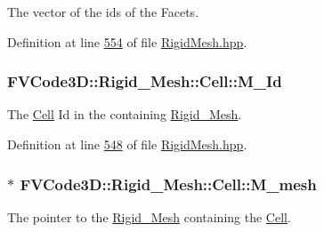 The vector of the ids of the Facets. 



Definition at line \hyperlink{RigidMesh_8hpp_source_l00554}{554} of file \hyperlink{RigidMesh_8hpp_source}{Rigid\+Mesh.\+hpp}.

\subsubsection[{\texorpdfstring{M\+\_\+\+Id}{M_Id}}]{ F\+V\+Code3\+D\+::\+Rigid\+\_\+\+Mesh\+::\+Cell\+::\+M\+\_\+\+Id\hspace{0.3cm}{\ttfamily [protected]}}\hypertarget{classFVCode3D_1_1Rigid__Mesh_1_1Cell_a69cd2ee5b40a1ccc5cb62c529c7abfb2}{}\label{classFVCode3D_1_1Rigid__Mesh_1_1Cell_a69cd2ee5b40a1ccc5cb62c529c7abfb2}


The \hyperlink{classFVCode3D_1_1Rigid__Mesh_1_1Cell}{Cell} Id in the containing \hyperlink{classFVCode3D_1_1Rigid__Mesh}{Rigid\+\_\+\+Mesh}. 



Definition at line \hyperlink{RigidMesh_8hpp_source_l00548}{548} of file \hyperlink{RigidMesh_8hpp_source}{Rigid\+Mesh.\+hpp}.

\subsubsection[{\texorpdfstring{M\+\_\+mesh}{M_mesh}}]{$\ast$ F\+V\+Code3\+D\+::\+Rigid\+\_\+\+Mesh\+::\+Cell\+::\+M\+\_\+mesh\hspace{0.3cm}{\ttfamily [protected]}}\hypertarget{classFVCode3D_1_1Rigid__Mesh_1_1Cell_ad4a1033c8e506b29487f2be4c4d69c0d}{}\label{classFVCode3D_1_1Rigid__Mesh_1_1Cell_ad4a1033c8e506b29487f2be4c4d69c0d}


The pointer to the \hyperlink{classFVCode3D_1_1Rigid__Mesh}{Rigid\+\_\+\+Mesh} containing the \hyperlink{classFVCode3D_1_1Rigid__Mesh_1_1Cell}{Cell}. 



